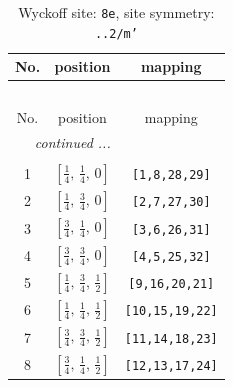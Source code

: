 \documentclass[fleqn,8pt]{jsarticle}
\begin{document}
\begin{longtable}{ccc}
\caption{Wyckoff site: {\tt 8e}, site symmetry: {\tt ..2/m'}}
 \\
 \hline \hline
No. & position & mapping \\ \hline \endfirsthead

\multicolumn{2}{l}{\tablename\ \thetable{}} \\
 \hline \hline
No. & position & mapping \\ \hline \endhead

 \hline \hline
\multicolumn{2}{r}{\footnotesize\it continued ...} \\ \endfoot

 \hline \hline
\multicolumn{2}{r}{} \\ \endlastfoot

1 & $\left[ \frac{1}{4},\, \frac{1}{4},\, 0 \right]$ & {\tt [1,8,28,29]} \\ \hline
2 & $\left[ \frac{1}{4},\, \frac{3}{4},\, 0 \right]$ & {\tt [2,7,27,30]} \\ \hline
3 & $\left[ \frac{3}{4},\, \frac{1}{4},\, 0 \right]$ & {\tt [3,6,26,31]} \\ \hline
4 & $\left[ \frac{3}{4},\, \frac{3}{4},\, 0 \right]$ & {\tt [4,5,25,32]} \\ \hline
5 & $\left[ \frac{1}{4},\, \frac{3}{4},\, \frac{1}{2} \right]$ & {\tt [9,16,20,21]} \\ \hline
6 & $\left[ \frac{1}{4},\, \frac{1}{4},\, \frac{1}{2} \right]$ & {\tt [10,15,19,22]} \\ \hline
7 & $\left[ \frac{3}{4},\, \frac{3}{4},\, \frac{1}{2} \right]$ & {\tt [11,14,18,23]} \\ \hline
8 & $\left[ \frac{3}{4},\, \frac{1}{4},\, \frac{1}{2} \right]$ & {\tt [12,13,17,24]} \\
\end{longtable}
\renewcommand{\arraystretch}{1.2}
\end{document}
